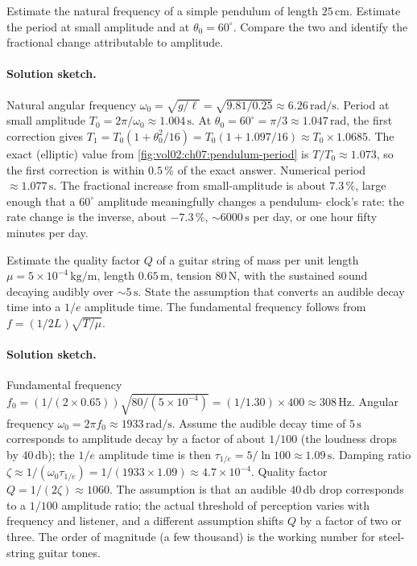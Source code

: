 \begin{exercise}
Estimate the natural frequency of a simple pendulum of length
$25\,\si{\centi\meter}$. Estimate the period at small amplitude
and at $\theta_{0} = 60^{\circ}$. Compare the two and identify
the fractional change attributable to amplitude.
\paragraph{Solution sketch.} Natural angular frequency $\omega_{0}
= \sqrt{g/\ell} = \sqrt{9.81/0.25} \approx 6.26\,\si{\radian\per
\second}$. Period at small amplitude $T_{0} = 2\pi/\omega_{0}
\approx 1.004\,\si{\second}$. At $\theta_{0} = 60^{\circ} = \pi/3
\approx 1.047\,\si{\radian}$, the first correction gives $T_{1}
= T_{0}(1 + \theta_{0}^{2}/16) = T_{0}(1 + 1.097/16) \approx T_{0}
\times 1.0685$. The exact (elliptic) value from
\cref{fig:vol02:ch07:pendulum-period} is $T/T_{0} \approx 1.073$,
so the first correction is within $0.5\,\%$ of the exact answer.
Numerical period $\approx 1.077\,\si{\second}$. The fractional
increase from small-amplitude is about $7.3\,\%$, large enough
that a $60^{\circ}$ amplitude meaningfully changes a pendulum-
clock's rate: the rate change is the inverse, about $-7.3\,\%$,
$\sim 6000\,\si{\second}$ per day, or one hour fifty minutes per
day.
\end{exercise}

\begin{exercise}
Estimate the quality factor $Q$ of a guitar string of mass per
unit length $\mu = 5 \times 10^{-4}\,\si{\kilogram\per\meter}$,
length $0.65\,\si{\meter}$, tension $80\,\si{\newton}$, with the
sustained sound decaying audibly over $\sim 5\,\si{\second}$.
State the assumption that converts an audible decay time into a
$1/e$ amplitude time. The fundamental frequency follows from $f =
(1/2L)\sqrt{T/\mu}$.

\paragraph{Solution sketch.} Fundamental frequency $f_{0} =
(1/(2 \times 0.65)) \sqrt{80/(5 \times 10^{-4})} = (1/1.30) \times
400 \approx 308\,\si{\hertz}$. Angular frequency $\omega_{0} = 2
\pi f_{0} \approx 1933\,\si{\radian\per\second}$. Assume the
audible decay time of $5\,\si{\second}$ corresponds to amplitude
decay by a factor of about $1/100$ (the loudness drops by
$40\,\si{\decibel}$); the $1/e$ amplitude time is then
$\tau_{1/e} = 5/\ln 100 \approx 1.09\,\si{\second}$. Damping
ratio $\zeta \approx 1/(\omega_{0} \tau_{1/e}) = 1/(1933 \times
1.09) \approx 4.7 \times 10^{-4}$. Quality factor $Q = 1/(2
\zeta) \approx 1060$. The assumption is that an audible
$40\,\si{\decibel}$ drop corresponds to a $1/100$ amplitude
ratio; the actual threshold of perception varies with frequency
and listener, and a different assumption shifts $Q$ by a factor
of two or three. The order of magnitude (a few thousand) is the
working number for steel-string guitar tones.
\end{exercise}

